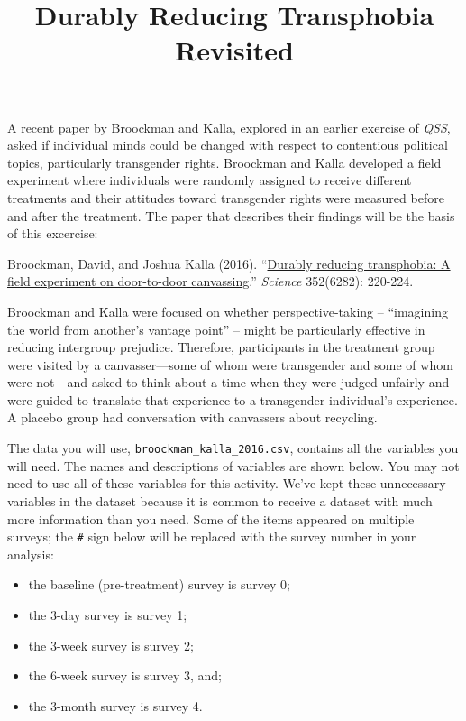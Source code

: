 \documentclass[]{article}
\title{Durably Reducing Transphobia Revisited}
\author{}
\date{}
\begin{document}
\maketitle


A recent paper by Broockman and Kalla, explored in an earlier exercise
of \emph{QSS}, asked if individual minds could be changed with respect
to contentious political topics, particularly transgender rights.
Broockman and Kalla developed a field experiment where individuals were
randomly assigned to receive different treatments and their attitudes
toward transgender rights were measured before and after the treatment.
The paper that describes their findings will be the basis of this
excercise:

Broockman, David, and Joshua Kalla (2016).
``\href{https://doi.org/10.1126/science.aad9713}{Durably reducing
transphobia: A field experiment on door-to-door canvassing}.''
\emph{Science} 352(6282): 220-224.

Broockman and Kalla were focused on whether perspective-taking --
``imagining the world from another's vantage point'' -- might be
particularly effective in reducing intergroup prejudice. Therefore,
participants in the treatment group were visited by a canvasser---some
of whom were transgender and some of whom were not---and asked to think
about a time when they were judged unfairly and were guided to translate
that experience to a transgender individual's experience. A placebo
group had conversation with canvassers about recycling.

The data you will use, \texttt{broockman\_kalla\_2016.csv}, contains all
the variables you will need. The names and descriptions of variables are
shown below. You may not need to use all of these variables for this
activity. We've kept these unnecessary variables in the dataset because
it is common to receive a dataset with much more information than you
need. Some of the items appeared on multiple surveys; the \texttt{\#}
sign below will be replaced with the survey number in your analysis:

\begin{itemize}
\itemsep1pt\parskip0pt
\item
  the baseline (pre-treatment) survey is survey 0;
\item
  the 3-day survey is survey 1;
\item
  the 3-week survey is survey 2;
\item
  the 6-week survey is survey 3, and;
\item
  the 3-month survey is survey 4.
\end{itemize}
\end{document}
